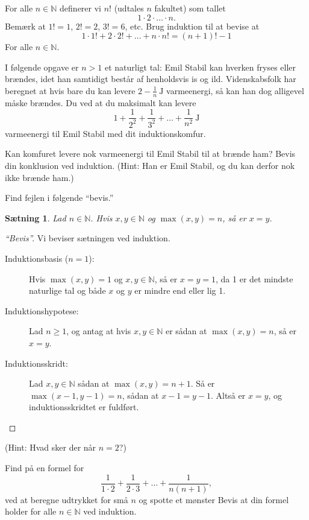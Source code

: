 \documentclass[a4paper,12pt]{article}
\theoremstyle{plain}
\newtheorem{saetning}{Sætning}
\newcommand{\N}{\mathbb{N}}
\begin{document}
\begin{Exercise}
For alle \(n\in\N\) definerer vi \(n!\) (udtales \(n\) fakultet) som tallet
\[
    1\cdot 2\cdot\dots\cdot n.
\]
Bemærk at \(1!=1\), \(2!=2\), \(3!=6\), etc. Brug induktion til at bevise at
\[
    1\cdot 1!+2\cdot 2!+\dots+n\cdot n!=(n+1)!-1
\]
For alle \(n\in\N\).
\end{Exercise}
\begin{Exercise}
  I følgende opgave er \(n>1\) et naturligt tal: Emil Stabil kan hverken fryses eller brændes, idet han samtidigt består af henholdsvis is og ild. Videnskabsfolk har beregnet at hvis bare du kan levere \( 2-\frac{1}{n}\ \mathrm{J}\) varmeenergi, så kan han dog alligevel måske brændes. Du ved at du maksimalt kan levere
  \[
    1+\frac{1}{2^2}+\frac{1}{3^2}+\dots+\frac{1}{n^2}\ \mathrm{J}
  \]
  varmeenergi til Emil Stabil med dit induktionskomfur.

  Kan komfuret levere nok varmeenergi til Emil Stabil til at brænde ham? Bevis din konklusion ved induktion. (Hint: Han er Emil Stabil, og du kan derfor nok ikke brænde ham.) 
\end{Exercise}
\begin{Exercise}
  Find fejlen i følgende ``bevis.'' 
\begin{saetning}
  Lad \(n\in\N\). Hvis \(x,y\in\N\) og \(\max(x,y)=n\), så er \(x=y\).
\end{saetning}
\begin{proof}[``Bevis'']
  Vi beviser sætningen ved induktion.
  \begin{description}
    \item[Induktionsbasis (\(n=1\)):] Hvis \(\max(x,y)=1\) og \(x,y\in\N\), så er \(x=y=1\), da 1 er det mindste naturlige tal og både \(x\) og \(y\) er mindre end eller lig 1.
    \item[Induktionshypotese:] Lad \(n\ge 1\), og antag at hvis \(x,y\in\N\) er sådan at \(\max(x,y)=n\), så er \(x=y\).
    \item[Induktionsskridt:] Lad \(x,y\in\N\) sådan at \(\max(x,y)=n+1\). Så er \(\max(x-1,y-1)=n\), sådan at \(x-1=y-1\). Altså er \(x=y\), og induktionsskridtet er fuldført.
  \end{description}
\end{proof}
 (Hint: Hvad sker der når \(n=2\)?)
\end{Exercise}
\begin{Exercise}[label={ex:6}]
  \Question Find på en formel for
  \[
    \frac{1}{1\cdot 2}+\frac{1}{2\cdot 3}+\dots+\frac{1}{n(n+1)},
  \]
  ved at beregne udtrykket for små \(n\) og spotte et mønster
  \Question Bevis at din formel holder for alle \(n\in\N\) ved induktion.
\end{Exercise}
\end{document}
